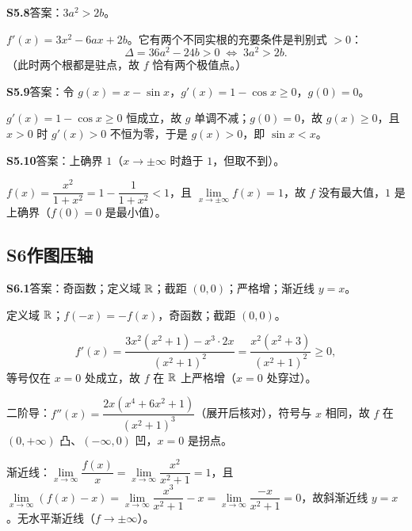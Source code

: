 \medskip
\noindent\textbf{S5.8}\quad 答案：$3a^{2}>2b$。

$f'(x)=3x^{2}-6ax+2b$。它有两个不同实根的充要条件是判别式 $>0$：
\[
\Delta=36a^{2}-24b>0\;\Longleftrightarrow\;3a^{2}>2b.
\]
（此时两个根都是驻点，故 $f$ 恰有两个极值点。）

\medskip
\noindent\textbf{S5.9}\quad 答案：令 $g(x)=x-\sin x$，$g'(x)=1-\cos x\geq0$，$g(0)=0$。

$g'(x)=1-\cos x\geq0$ 恒成立，故 $g$ 单调不减；$g(0)=0$，故 $g(x)\geq0$，且 $x>0$ 时 $g'(x)>0$ 不恒为零，于是 $g(x)>0$，即 $\sin x<x$。

\medskip
\noindent\textbf{S5.10}\quad 答案：上确界 $1$（$x\to\pm\infty$ 时趋于 $1$，但取不到）。

$f(x)=\dfrac{x^{2}}{1+x^{2}}=1-\dfrac{1}{1+x^{2}}<1$，且 $\lim\limits_{x\to\pm\infty}f(x)=1$，故 $f$ 没有最大值，$1$ 是上确界（$f(0)=0$ 是最小值）。

\subsection{S6\quad 作图压轴}

\noindent\textbf{S6.1}\quad 答案：奇函数；定义域 $\mathbb{R}$；截距 $(0,0)$；严格增；渐近线 $y=x$。

定义域 $\mathbb{R}$；$f(-x)=-f(x)$，奇函数；截距 $(0,0)$。

\[
f'(x)=\frac{3x^{2}(x^{2}+1)-x^{3}\cdot2x}{(x^{2}+1)^{2}}=\frac{x^{2}(x^{2}+3)}{(x^{2}+1)^{2}}\geq0,
\]
等号仅在 $x=0$ 处成立，故 $f$ 在 $\mathbb{R}$ 上严格增（$x=0$ 处穿过）。

二阶导：$f''(x)=\dfrac{2x(x^{4}+6x^{2}+1)}{(x^{2}+1)^{3}}$（展开后核对），符号与 $x$ 相同，故 $f$ 在 $(0,+\infty)$ 凸、$(-\infty,0)$ 凹，$x=0$ 是拐点。

渐近线：$\lim\limits_{x\to\infty}\dfrac{f(x)}{x}=\lim\limits_{x\to\infty}\dfrac{x^{2}}{x^{2}+1}=1$，且 $\lim\limits_{x\to\infty}(f(x)-x)=\lim\limits_{x\to\infty}\dfrac{x^{3}}{x^{2}+1}-x=\lim\limits_{x\to\infty}\dfrac{-x}{x^{2}+1}=0$，故斜渐近线 $y=x$。无水平渐近线（$f\to\pm\infty$）。

